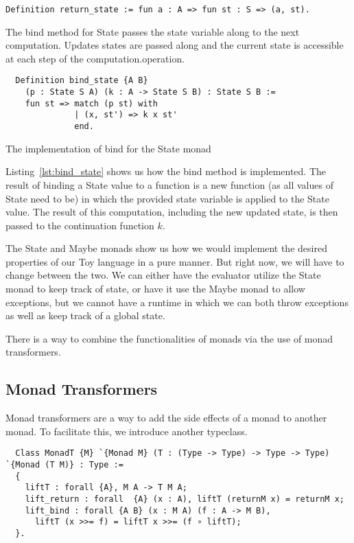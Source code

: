 \begin{listing}[H]
\begin{verbatim}
Definition return_state := fun a : A => fun st : S => (a, st).
\end{verbatim}
\end{listing}

The bind method for State passes the state variable along to the next
computation. Updates states are passed along and the current state is
accessible at each step of the computation.operation.

\begin{listing}[H]
\begin{verbatim}
  Definition bind_state {A B} 
    (p : State S A) (k : A -> State S B) : State S B :=
    fun st => match (p st) with
              | (x, st') => k x st'
              end.
\end{verbatim}
\caption{The implementation of bind for the State monad}
\label{lst:bind_state}
\end{listing}

Listing~\ref{lst:bind_state} shows us how the bind method is implemented. The
result of binding a State value to a function is a new function (as all values
of State need to be) in which the provided state variable is applied to the
State value. The result of this computation, including the new updated state,
is then passed to the continuation function $k$.

The State and Maybe monads show us how we would implement the desired
properties of our Toy language in a pure manner. But right now, we will have to
change between the two. We can either have the evaluator utilize the State
monad to keep track of state, or have it use the Maybe monad to allow
exceptions, but we cannot have a runtime in which we can both throw exceptions
as well as keep track of a global state. 

There is a way to combine the functionalities of monads via the use of monad
transformers. 

\subsection{Monad Transformers}
Monad transformers are a way to add the side effects of a monad to another
monad. To facilitate this, we introduce another typeclass.

\begin{listing}
\begin{verbatim}
  Class MonadT {M} `{Monad M} (T : (Type -> Type) -> Type -> Type)  `{Monad (T M)} : Type :=
  {
    liftT : forall {A}, M A -> T M A;
    lift_return : forall  {A} (x : A), liftT (returnM x) = returnM x;
    lift_bind : forall {A B} (x : M A) (f : A -> M B),
      liftT (x >>= f) = liftT x >>= (f ∘ liftT);
  }.
\end{verbatim}
\end{listing}


